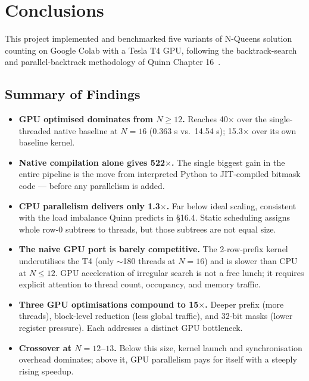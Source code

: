 \documentclass[12pt, letterpaper]{article}
\begin{document}
\section{Conclusions}
\label{sec:conclusions}

This project implemented and benchmarked five variants of N-Queens solution counting on Google Colab with a Tesla T4 GPU, following the backtrack-search and parallel-backtrack methodology of Quinn Chapter 16~\cite{quinn2004}.

\subsection{Summary of Findings}

\begin{itemize}
    \item \textbf{GPU optimised dominates from $N \geq 12$.} Reaches 40$\times$ over the single-threaded native baseline at $N = 16$ (0.363 s vs.\ 14.54 s); 15.3$\times$ over its own baseline kernel.
    \item \textbf{Native compilation alone gives 522$\times$.} The single biggest gain in the entire pipeline is the move from interpreted Python to JIT-compiled bitmask code --- before any parallelism is added.
    \item \textbf{CPU parallelism delivers only 1.3$\times$.} Far below ideal scaling, consistent with the load imbalance Quinn predicts in \S 16.4. Static scheduling assigns whole row-0 subtrees to threads, but those subtrees are not equal size.
    \item \textbf{The naive GPU port is barely competitive.} The 2-row-prefix kernel underutilises the T4 (only $\sim$180 threads at $N = 16$) and is slower than CPU at $N \leq 12$. GPU acceleration of irregular search is not a free lunch; it requires explicit attention to thread count, occupancy, and memory traffic.
    \item \textbf{Three GPU optimisations compound to 15$\times$.} Deeper prefix (more threads), block-level reduction (less global traffic), and 32-bit masks (lower register pressure). Each addresses a distinct GPU bottleneck.
    \item \textbf{Crossover at $N = 12$--$13$.} Below this size, kernel launch and synchronisation overhead dominates; above it, GPU parallelism pays for itself with a steeply rising speedup.
\end{itemize}
\end{document}
